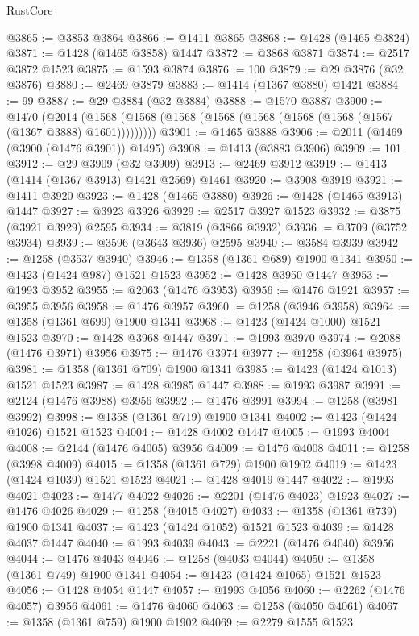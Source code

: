 \begin{lexlean}{RustCore}
\begin{coremodule}
{\begin{coremodule}
{{{{{{{{{{{{{{{{{{{{{{{{{{{{{{{{{{{{{{{{{{{{{{{@3865 := @3853 @3864
@3866 := @1411 @3865
@3868 := @1428 (@1465 @3824)
@3871 := @1428 (@1465 @3858) @1447
@3872 := @3868 @3871
@3874 := @2517 @3872 @1523
@3875 := @1593 @3874
@3876 := 100
@3879 := @29 @3876 (@32 @3876)
@3880 := @2469 @3879
@3883 := @1414 (@1367 @3880) @1421
@3884 := 99
@3887 := @29 @3884 (@32 @3884)
@3888 := @1570 @3887
@3900 := @1470
    (@2014 (@1568 (@1568 (@1568 (@1568 (@1568 (@1568 (@1568 (@1567 (@1367 @3888) @1601)))))))))
@3901 := @1465 @3888
@3906 := @2011 (@1469 (@3900 (@1476 @3901)) @1495)
@3908 := @1413 (@3883 @3906)
@3909 := 101
@3912 := @29 @3909 (@32 @3909)
@3913 := @2469 @3912
@3919 := @1413 (@1414 (@1367 @3913) @1421 @2569) @1461
@3920 := @3908 @3919
@3921 := @1411 @3920
@3923 := @1428 (@1465 @3880)
@3926 := @1428 (@1465 @3913) @1447
@3927 := @3923 @3926
@3929 := @2517 @3927 @1523
@3932 := @3875 (@3921 @3929) @2595
@3934 := @3819 (@3866 @3932)
@3936 := @3709 (@3752 @3934)
@3939 := @3596 (@3643 @3936) @2595
@3940 := @3584 @3939
@3942 := @1258 (@3537 @3940)
@3946 := @1358 (@1361 @689) @1900 @1341
@3950 := @1423 (@1424 @987) @1521 @1523
@3952 := @1428 @3950 @1447
@3953 := @1993 @3952
@3955 := @2063 (@1476 @3953)
@3956 := @1476 @1921
@3957 := @3955 @3956
@3958 := @1476 @3957
@3960 := @1258 (@3946 @3958)
@3964 := @1358 (@1361 @699) @1900 @1341
@3968 := @1423 (@1424 @1000) @1521 @1523
@3970 := @1428 @3968 @1447
@3971 := @1993 @3970
@3974 := @2088 (@1476 @3971) @3956
@3975 := @1476 @3974
@3977 := @1258 (@3964 @3975)
@3981 := @1358 (@1361 @709) @1900 @1341
@3985 := @1423 (@1424 @1013) @1521 @1523
@3987 := @1428 @3985 @1447
@3988 := @1993 @3987
@3991 := @2124 (@1476 @3988) @3956
@3992 := @1476 @3991
@3994 := @1258 (@3981 @3992)
@3998 := @1358 (@1361 @719) @1900 @1341
@4002 := @1423 (@1424 @1026) @1521 @1523
@4004 := @1428 @4002 @1447
@4005 := @1993 @4004
@4008 := @2144 (@1476 @4005) @3956
@4009 := @1476 @4008
@4011 := @1258 (@3998 @4009)
@4015 := @1358 (@1361 @729) @1900 @1902
@4019 := @1423 (@1424 @1039) @1521 @1523
@4021 := @1428 @4019 @1447
@4022 := @1993 @4021
@4023 := @1477 @4022
@4026 := @2201 (@1476 @4023) @1923
@4027 := @1476 @4026
@4029 := @1258 (@4015 @4027)
@4033 := @1358 (@1361 @739) @1900 @1341
@4037 := @1423 (@1424 @1052) @1521 @1523
@4039 := @1428 @4037 @1447
@4040 := @1993 @4039
@4043 := @2221 (@1476 @4040) @3956
@4044 := @1476 @4043
@4046 := @1258 (@4033 @4044)
@4050 := @1358 (@1361 @749) @1900 @1341
@4054 := @1423 (@1424 @1065) @1521 @1523
@4056 := @1428 @4054 @1447
@4057 := @1993 @4056
@4060 := @2262 (@1476 @4057) @3956
@4061 := @1476 @4060
@4063 := @1258 (@4050 @4061)
@4067 := @1358 (@1361 @759) @1900 @1902
@4069 := @2279 @1555 @1523
}}}}}}}}}}}}}}}}}}}}}}}}}}}}}}}}}}}}}}}}}}}}}}}
\end{coremodule}}
\end{coremodule}
\end{lexlean}
